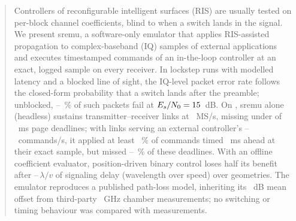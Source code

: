 \begin{abstract}
Controllers of reconfigurable intelligent surfaces (RIS) are usually tested on per-block
channel coefficients, blind to when a switch lands in the signal. We present sremu, a
software-only emulator that applies RIS-assisted propagation to complex-baseband (IQ) samples
of external applications and executes timestamped commands of an in-the-loop controller at an
exact, logged sample on every receiver. In lockstep runs with modelled latency and a blocked
line of sight, the IQ-level packet error rate follows the closed-form probability that a
switch lands after the preamble; unblocked,
\numEbLosLoExposedMinPct--\numEbLosLoExposedMaxPct~\% of such packets fail at
$E_s/N_0=\numEbArcEsnoLowDb$~dB. On \txtPacedPlatform{}, sremu alone (headless) sustains
\numPacedLinks{} transmitter--receiver links at \numPacedMSps~MS/s, missing under
\numSustainMissRate{} of \numSustainSlackMs~ms page deadlines; with \numBfourLinks{} links
serving an external controller's \numBfourRateLowHz--\numBfourRateMidHz~commands/s, it applied
at least
\numBfourExactOkMinPct~\% of commands timed \numBfourLeadOkMs~ms ahead at their exact sample,
but missed \numBfourMissLowMinPct--\numBfourMissMidMaxPct~\% of these deadlines. With an
offline coefficient evaluator, position-driven binary control loses half its benefit after
\numEaTauLambdaVMin--\numEaTauLambdaVMax\,$\lambda/v$ of signaling delay (wavelength over
speed) over \numEaGeometries{} geometries. The emulator reproduces a published
path-loss model, inheriting its \numTangPubMeasBiasDb~dB mean offset from third-party
\numTangFcGHz~GHz chamber measurements; no switching or timing behaviour was compared with
measurements.
\end{abstract}
